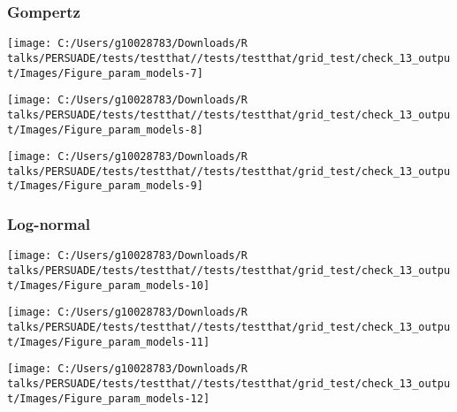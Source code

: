 \documentclass[
]{article}
\begin{document}
\clearpage

\subsubsection{Gompertz}\label{gompertz}

\begin{flushleft}\texttt{[image: C:/Users/g10028783/Downloads/R talks/PERSUADE/tests/testthat//tests/testthat/grid\_test/check\_13\_output/Images/Figure\_param\_models-7]} \end{flushleft}

\begin{flushleft}\texttt{[image: C:/Users/g10028783/Downloads/R talks/PERSUADE/tests/testthat//tests/testthat/grid\_test/check\_13\_output/Images/Figure\_param\_models-8]} \end{flushleft}

\begin{flushleft}\texttt{[image: C:/Users/g10028783/Downloads/R talks/PERSUADE/tests/testthat//tests/testthat/grid\_test/check\_13\_output/Images/Figure\_param\_models-9]} \end{flushleft}

\clearpage

\subsubsection{Log-normal}\label{log-normal}

\begin{flushleft}\texttt{[image: C:/Users/g10028783/Downloads/R talks/PERSUADE/tests/testthat//tests/testthat/grid\_test/check\_13\_output/Images/Figure\_param\_models-10]} \end{flushleft}

\begin{flushleft}\texttt{[image: C:/Users/g10028783/Downloads/R talks/PERSUADE/tests/testthat//tests/testthat/grid\_test/check\_13\_output/Images/Figure\_param\_models-11]} \end{flushleft}

\begin{flushleft}\texttt{[image: C:/Users/g10028783/Downloads/R talks/PERSUADE/tests/testthat//tests/testthat/grid\_test/check\_13\_output/Images/Figure\_param\_models-12]} \end{flushleft}

\clearpage
\end{document}
